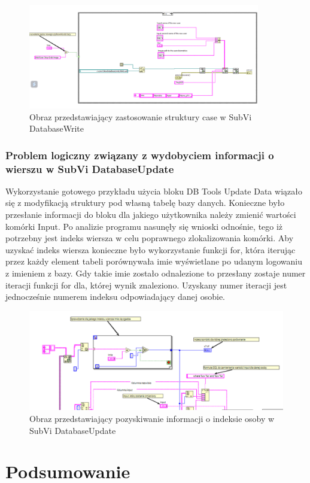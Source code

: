 \documentclass{report}
\begin{document}
\begin{figure}[H]
    \centering
    \includegraphics[width=0.9\textwidth]{src/Database/Database_write_subvi.png}
    \caption{Obraz przedstawiający zastosowanie struktury case w SubVi DatabaseWrite}
    \label{fig:first-att}
\end{figure}

\subsubsection{\large Problem logiczny związany z wydobyciem informacji o wierszu w SubVi DatabaseUpdate}

Wykorzystanie gotowego przykładu użycia bloku DB Tools Update Data wiązało się z modyfikacją struktury pod własną tabelę bazy danych.
Konieczne było przesłanie informacji do bloku dla jakiego użytkownika należy zmienić wartości komórki Input. Po analizie programu nasunęły się wnioski
odnośnie, tego iż potrzebny jest indeks wiersza w celu poprawnego zlokalizowania komórki. Aby uzyskać indeks wiersza konieczne było wykorzystanie funkcji for, 
która iterując przez każdy element tabeli porównywała imie wyświetlane po udanym logowaniu z imieniem z bazy. Gdy takie imie zostało odnalezione 
to przesłany zostaje numer iteracji funkcji for dla, której wynik znaleziono. Uzyskany numer iteracji jest jednocześnie numerem indeksu odpowiadający danej osobie.

\begin{figure}[H]
    \centering
    \includegraphics[width=1.0\textwidth]{src/Database/Update_iteration.png}
    \caption{Obraz przedstawiający pozyskiwanie informacji o indeksie osoby w SubVi DatabaseUpdate}
    \label{fig:first-att}
\end{figure}

\section{\LARGE Podsumowanie}
\end{document}
